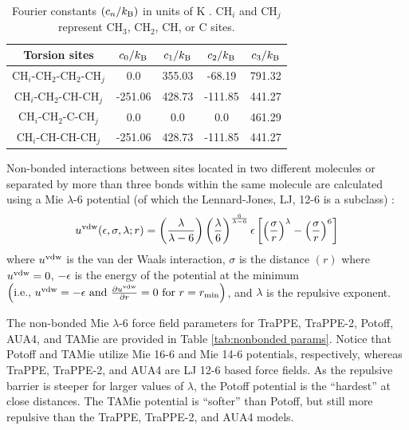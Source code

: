 \documentclass[preprint,review,12pt]{elsarticle}
\begin{document}
	\begin{table}[h!]
		\caption{Fourier constants $(c_n/k_{\rm B})$ in units of K \cite{Martin1999}. CH$_i$ and CH$_j$ represent CH$_3$, CH$_2$, CH, or C sites.} \label{tab:torsions}
		\begin{center}
			\begin{tabular}{|c|c|c|c|c|}
				\hline
				Torsion sites & $c_0/k_{\rm B}$ & $c_1/k_{\rm B}$ & $c_2/k_{\rm B}$ & $c_3/k_{\rm B}$ \\ \hline
				CH$_i$-CH$_2$-CH$_2$-CH$_j$ & 0.0 & 355.03 & -68.19 & 791.32 \\ 
				CH$_i$-CH$_2$-CH-CH$_j$ & -251.06 & 428.73 & -111.85 & 441.27 \\
				CH$_i$-CH$_2$-C-CH$_j$ & 0.0 & 0.0 & 0.0 & 461.29 \\
				CH$_i$-CH-CH-CH$_j$ & -251.06 & 428.73 & -111.85 & 441.27 \\
				\hline
			\end{tabular}
		\end{center} 
	\end{table}

	Non-bonded interactions between sites located in two different molecules or separated by more than three bonds within the same molecule are calculated using a Mie $\lambda$-6 potential (of which the Lennard-Jones, LJ, 12-6 is a subclass) \cite{Herdes2015}:
	\begin{equation} \label{eq:Mie}
	u^{\rm vdw}(\epsilon,\sigma,\lambda;r) = \left(\frac{\lambda}{\lambda - 6}\right)\left(\frac{\lambda}{6}\right)^{\frac{6}{\lambda - 6}} \epsilon \left[\left(\frac{\sigma}{r}\right)^{\lambda} - \left(\frac{\sigma}{r}\right)^6\right]
	\end{equation} 
	where $u^{\rm vdw}$ is the van der Waals interaction, $\sigma$ is the distance $(r)$ where $u^{\rm vdw} = 0$, $-\epsilon$ is the energy of the potential at the minimum $\left(\text{i.e., }u^{\rm vdw} = -\epsilon \text{ and } \frac{\partial u^{\rm vdw}}{\partial r} = 0 \text{ for } r=r_{\rm min} \right)$, and $\lambda$ is the repulsive exponent. 
	
	The non-bonded Mie $\lambda$-6 force field parameters for TraPPE, TraPPE-2, Potoff, AUA4, and TAMie are provided in Table \ref{tab:nonbonded params}. Notice that Potoff and TAMie utilize Mie 16-6 and Mie 14-6 potentials, respectively, whereas TraPPE, TraPPE-2, and AUA4 are LJ 12-6 based force fields. As the repulsive barrier is steeper for larger values of $\lambda$, the Potoff potential is the ``hardest'' at close distances. The TAMie potential is ``softer'' than Potoff, but still more repulsive than the TraPPE, TraPPE-2, and AUA4 models.
	
\end{document}
